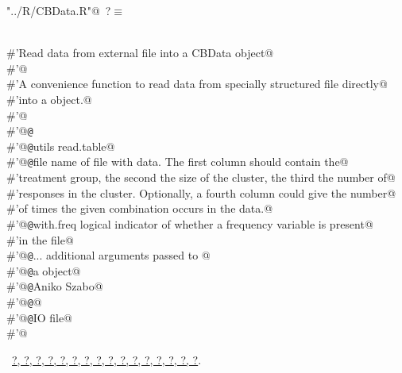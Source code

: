 \documentclass[reqno]{amsart}
\renewcommand{\NWtarget}[2]{\hypertarget{#1}{#2}}
\renewcommand{\NWlink}[2]{\hyperlink{#1}{#2}}
\begin{document}
\begin{flushleft} \small
\begin{minipage}{\linewidth}\label{scrap4}\raggedright\small
\NWtarget{nuweb?}{} \verb@"../R/CBData.R"@\nobreak\ {\footnotesize {?}}$\equiv$
\vspace{-1ex}
\begin{list}{}{} \item
\mbox{}\verb@@\\
\mbox{}\verb@#'Read data from external file into a CBData object@\\
\mbox{}\verb@#'@\\
\mbox{}\verb@#'A convenience function to read data from specially structured file directly@\\
\mbox{}\verb@#'into a  object.@\\
\mbox{}\verb@#'@\\
\mbox{}\verb@#'@{\tt @}\verb@export@\\
\mbox{}\verb@#'@{\tt @}\verb@importFrom utils read.table@\\
\mbox{}\verb@#'@{\tt @}\verb@param file name of file with data. The first column should contain the@\\
\mbox{}\verb@#'treatment group, the second the size of the cluster, the third the number of@\\
\mbox{}\verb@#'responses in the cluster. Optionally, a fourth column could give the number@\\
\mbox{}\verb@#'of times the given combination occurs in the data.@\\
\mbox{}\verb@#'@{\tt @}\verb@param with.freq logical indicator of whether a frequency variable is present@\\
\mbox{}\verb@#'in the file@\\
\mbox{}\verb@#'@{\tt @}\verb@param ... additional arguments passed to @\\
\mbox{}\verb@#'@{\tt @}\verb@return a  object@\\
\mbox{}\verb@#'@{\tt @}\verb@author Aniko Szabo@\\
\mbox{}\verb@#'@{\tt @}\verb@seealso {}@\\
\mbox{}\verb@#'@{\tt @}\verb@keywords IO file@\\
\mbox{}\verb@#'@\\
\mbox{}\verb@@{\NWsep}
\end{list}
\vspace{-1.5ex}
\footnotesize
\begin{list}{}{\setlength{\itemsep}{-\parsep}\setlength{\itemindent}{-\leftmargin}}
\item \NWtxtFileDefBy\ \NWlink{nuweb?}{?}\NWlink{nuweb?}{, ?}\NWlink{nuweb?}{, ?}\NWlink{nuweb?}{, ?}\NWlink{nuweb?}{, ?}\NWlink{nuweb?}{, ?}\NWlink{nuweb?}{, ?}\NWlink{nuweb?}{, ?}\NWlink{nuweb?}{, ?}\NWlink{nuweb?}{, ?}\NWlink{nuweb?}{, ?}\NWlink{nuweb?}{, ?}\NWlink{nuweb?}{, ?}\NWlink{nuweb?}{, ?}\NWlink{nuweb?}{, ?}\NWlink{nuweb?}{, ?}.

\item{}
\end{list}
\end{minipage}\vspace{4ex}
\end{flushleft}
\end{document}

